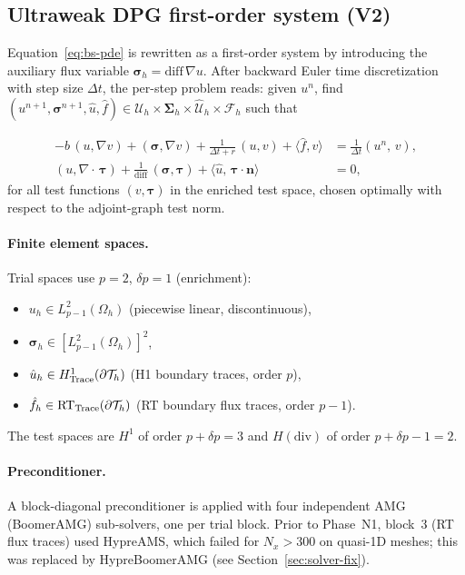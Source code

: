 \documentclass[11pt,a4paper]{article}
\newcommand{\Nx}{N_x}
\newcommand{\dt}{\Delta t}
\begin{document}
\subsection{Ultraweak DPG first-order system (V2)}

Equation~\eqref{eq:bs-pde} is rewritten as a first-order system by
introducing the auxiliary flux variable
$\boldsymbol{\sigma}_h = \mathrm{diff}\,\nabla u$.  After backward
Euler time discretization with step size $\dt$, the per-step problem
reads: given $u^n$, find $(u^{n+1},\boldsymbol{\sigma}^{n+1},
\hat{u},\hat{f})\in\mathcal{U}_h\times\boldsymbol{\Sigma}_h\times
\hat{\mathcal{U}}_h\times\hat{\mathcal{F}}_h$ such that

\begin{align}
  -b\,(u,\nabla v)
  + (\boldsymbol{\sigma},\nabla v)
  + \tfrac{1}{\dt+r}\,(u,v)
  + \langle \hat{f}, v \rangle
  &= \tfrac{1}{\dt}(u^n,\,v),
  \label{eq:uw-row1}\\[4pt]
  (u,\nabla{\cdot}\,\boldsymbol{\tau})
  + \tfrac{1}{\mathrm{diff}}\,(\boldsymbol{\sigma},\boldsymbol{\tau})
  + \langle \hat{u},\,\boldsymbol{\tau}{\cdot}\mathbf{n}\rangle
  &= 0,
  \label{eq:uw-row2}
\end{align}
for all test functions $(v,\boldsymbol{\tau})$ in the enriched test
space, chosen optimally with respect to the adjoint-graph
test norm.

\paragraph{Finite element spaces.}
Trial spaces use $p=2$, $\delta p = 1$ (enrichment):
\begin{itemize}[noitemsep]
  \item $u_h \in L^2_{p-1}(\Omega_h)$ (piecewise linear, discontinuous),
  \item $\boldsymbol{\sigma}_h \in [L^2_{p-1}(\Omega_h)]^2$,
  \item $\hat{u}_h \in H^1_{\rm Trace}(\partial\mathcal{T}_h)$
         (H1 boundary traces, order $p$),
  \item $\hat{f}_h \in \mathrm{RT}_{\rm Trace}(\partial\mathcal{T}_h)$
         (RT boundary flux traces, order $p-1$).
\end{itemize}
The test spaces are $H^1$ of order $p+\delta p = 3$ and
$H(\mathrm{div})$ of order $p+\delta p-1=2$.

\paragraph{Preconditioner.}
A block-diagonal preconditioner is applied with four independent
AMG (BoomerAMG) sub-solvers, one per trial block.
Prior to Phase~N1, block~3 (RT flux traces) used HypreAMS,
which failed for $\Nx > 300$ on quasi-1D meshes;
this was replaced by HypreBoomerAMG (see Section~\ref{sec:solver-fix}).
\end{document}
